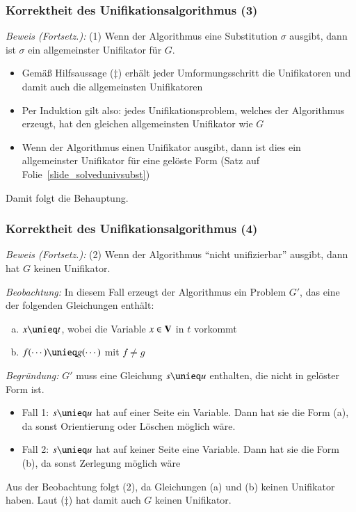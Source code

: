 \documentclass[onlymath]{beamer}
\begin{document}
\begin{frame}[t]\frametitle{Korrektheit des Unifikationsalgorithmus (3)}


\emph{Beweis (Fortsetz.):} (1) Wenn der Algorithmus eine Substitution $\sigma$ ausgibt, dann ist $\sigma$ ein allgemeinster Unifikator für $G$.
\smallskip\pause

\begin{itemize}
\item Gemäß Hilfsaussage ($\ddagger$) erhält jeder Umformungsschritt die Unifikatoren und damit auch die allgemeinsten Unifikatoren\pause
\item Per Induktion gilt also: jedes Unifikationsproblem, welches der Algorithmus erzeugt, hat den gleichen allgemeinsten Unifikator wie $G$\pause
\item Wenn der Algorithmus einen Unifikator ausgibt, dann ist dies ein allgemeinster Unifikator für eine gelöste Form (Satz auf Folie~\ref{slide_solvedunivsubst})
\end{itemize}
Damit folgt die Behauptung.

\end{frame}

\begin{frame}[t]\frametitle{Korrektheit des Unifikationsalgorithmus (4)}


\emph{Beweis (Fortsetz.):} (2) Wenn der Algorithmus "`nicht unifizierbar"' ausgibt, dann hat $G$ keinen Unifikator.
\smallskip\pause

\emph{Beobachtung:} In diesem Fall erzeugt der Algorithmus ein Problem $G'$, das eine der folgenden Gleichungen enthält:
\begin{enumerate}[(a)]
\item $x\unieq t$, wobei die Variable $x\in\textbf{\textcolor{black}{V}}$ in $t$ vorkommt
\item $f(\cdots)\unieq g(\cdots)$ mit $f\neq g$
\end{enumerate}
\pause\emph{Begründung:} $G'$ muss eine Gleichung $s\unieq u$ enthalten, die nicht in gelöster Form ist.
\begin{itemize}
\item Fall 1: $s\unieq u$ hat auf einer Seite ein Variable. Dann hat sie die Form (a), da sonst Orientierung oder Löschen möglich wäre.
\item Fall 2: $s\unieq u$ hat auf keiner Seite eine Variable. Dann hat sie die Form (b), da sonst Zerlegung möglich wäre
\end{itemize}
\pause Aus der Beobachtung folgt (2), da Gleichungen (a) und (b) keinen Unifikator haben.
Laut ($\ddagger$) hat damit auch $G$ keinen Unifikator.


\end{frame}
\end{document}
